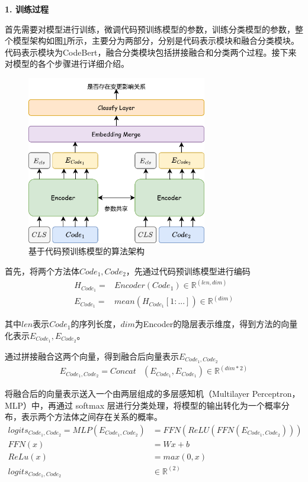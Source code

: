 \noindent \textbf{1. 训练过程}

首先需要对模型进行训练，微调代码预训练模型的参数，训练分类模型的参数，整个模型架构如图\ref{1_code_bert_overall}所示，主要分为两部分，分别是代码表示模块和融合分类模块。代码表示模块为CodeBert，融合分类模块包括拼接融合和分类两个过程。接下来对模型的各个步骤进行详细介绍。
\vspace{0mm}
\begin{figure}[h]
\centering
\includegraphics[width = 0.70\textwidth]{figures/1_code_bert_overall.png}
\caption{基于代码预训练模型的算法架构}
\label{1_code_bert_overall}
\end{figure}


首先，将两个方法体$ Code_1, Code_2$，先通过代码预训练模型进行编码
\begin{align}
H_{Code_1}=&Encoder(Code_1) \in \mathbb{R}^{(len,dim)} \\
E_{Code_1}=&mean(H_{Code_1}[1:...]) \in \mathbb{R}^{(dim)}
\end{align}

其中$len$表示$Code_1$的序列长度，$dim$为Encoder的隐层表示维度，得到方法的向量化表示$ E_{Code_1}, E_{Code_2}$。

通过拼接融合这两个向量，得到融合后向量表示$E_{Code_1,Code_2}$
\begin{align}
E_{Code_1,Code_2}=Concat& (E_{Code_1},E_{Code_1})\in \mathbb{R}^{(dim*2)} 
\end{align}

将融合后的向量表示送入一个由两层组成的多层感知机（Multilayer Perceptron，MLP）中，再通过 softmax 层进行分类处理，将模型的输出转化为一个概率分布，表示两个方法体之间存在关系的概率。
\begin{align}
logits_{Code_1,Code_2}=MLP(E_{Code_1,Code_2})&=FFN(ReLU(FFN(E_{Code_1,Code_2}))) \\
FFN(x)&=Wx+b\\
ReLu(x)&=max(0,x)\\
logits_{Code_1,Code_2}& \in \mathbb{R}^{(2)}
\end{align}

